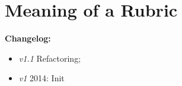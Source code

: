 \chapter{Meaning of a Rubric}
\setcounter{section}{0}

\textbf{Changelog:}\\
\begin{itemize}
	\item \textit{v1.1} Refactoring;  
	\item \textit{v1} 2014: Init
\end{itemize}

\pagebreak

